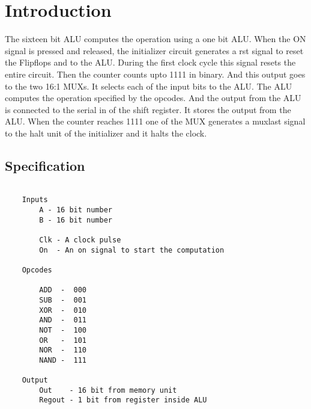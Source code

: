 \documentclass[../main]{subfiles}
\begin{document}
\section{Introduction}

The sixteen bit ALU computes the operation using a one bit ALU. When the ON
signal is pressed and released, the initializer circuit generates a rst signal
to reset the Flipflops and to the ALU. During the first clock cycle this signal
resets the entire circuit. Then the counter counts upto 1111 in binary. And
this output goes to the two 16:1 MUXs. It selects each of the input bits to the
ALU. The ALU computes the operation specified by the opcodes. And the output
from the ALU is connected to the serial in of the shift register. It stores the
output from the ALU. When the counter reaches 1111 one of the MUX generates a
muxlast signal to the halt unit of the initializer and it halts the clock.

\subsection {Specification}

\begin{verbatim}

    Inputs
        A - 16 bit number
        B - 16 bit number

        Clk - A clock pulse
        On  - An on signal to start the computation

    Opcodes

        ADD  -  000
        SUB  -  001
        XOR  -  010
        AND  -  011
        NOT  -  100
        OR   -  101
        NOR  -  110
        NAND -  111

    Output
        Out    - 16 bit from memory unit
        Regout - 1 bit from register inside ALU


\end{verbatim}
\end{document}
